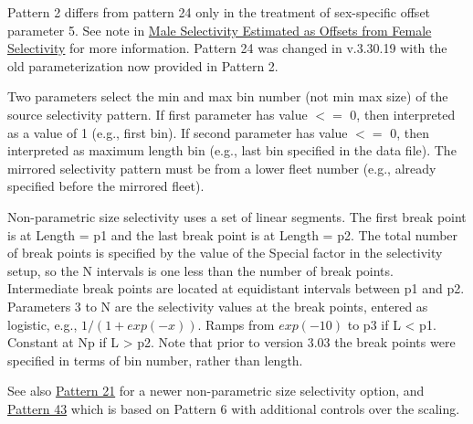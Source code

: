 \hypertarget{Pattern2}{}
Pattern 2 differs from pattern 24 only in the treatment of sex-specific offset parameter 5. See note in \hyperlink{MaleSelectivityOffset}{Male Selectivity Estimated as Offsets from Female Selectivity} for more information. Pattern 24 was changed in v.3.30.19 with the old parameterization now provided in Pattern 2.

\hypertarget{MirrorSelectivity}{}
Two parameters select the min and max bin number (not min max size) of the source selectivity pattern. If first parameter has value $<=$ 0, then interpreted as a value of 1 (e.g., first bin). If second parameter has value $<=$ 0, then interpreted as maximum length bin (e.g., last bin specified in the data file). The mirrored selectivity pattern must be from a lower fleet number (e.g., already specified before the mirrored fleet).

\hypertarget{NonParamSelectivity6}{}
Non-parametric size selectivity uses a set of linear segments. The first break point is at Length = p1 and the last break point is at Length = p2. The total number of break points is specified by the value of the Special factor in the selectivity setup, so the N intervals is one less than the number of break points. Intermediate break points are located at equidistant intervals between p1 and p2. Parameters 3 to N are the selectivity values at the break points, entered as logistic, e.g., $1/(1+exp(-x))$. Ramps from $exp(-10)$ to p3 if L < p1. Constant at Np if L > p2. Note that prior to version 3.03 the break points were specified in terms of bin number, rather than length.

See also \hyperlink{NonParamSelectivity21}{Pattern 21} for a newer non-parametric size selectivity option, and \hyperlink{NonParamScaling}{Pattern 43} which is based on Pattern 6 with additional controls over the scaling.

